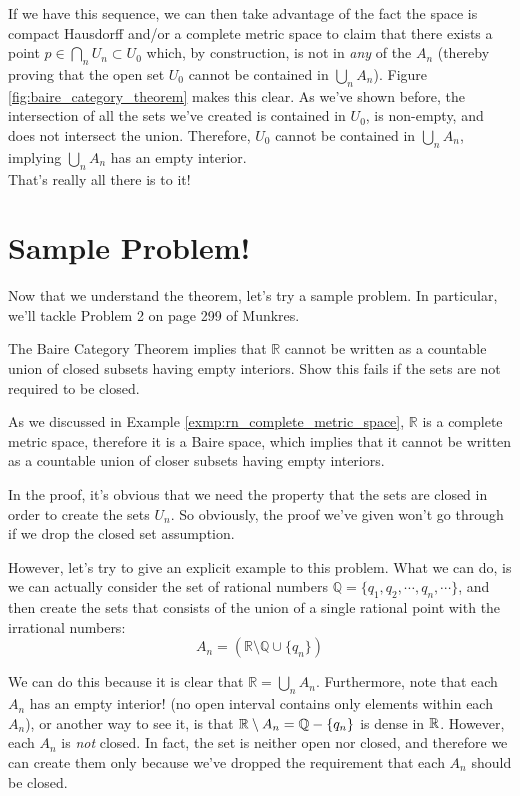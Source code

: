 \documentclass[english, 11pt]{article}
\begin{document}
  If we have this sequence, we can then take advantage of the fact the space is compact Hausdorff and/or a complete metric space to claim that there exists a point $p \in \bigcap_n U_n \subset U_0$ which, by construction, is not in \textit{any} of the $A_n$ (thereby proving that the open set $U_0$ cannot be contained in $\bigcup_n A_n$). Figure \ref{fig:baire_category_theorem} makes this clear. As we've shown before, the intersection of all the sets we've created is contained in $U_0$, is non-empty, and does not intersect the union. Therefore, $U_0$ cannot be contained in $\bigcup_n A_n$, implying $\bigcup_n A_n$ has an empty interior.\\

  That's really all there is to it!

  \section{Sample Problem!}
  Now that we understand the theorem, let's try a sample problem. In particular, we'll tackle Problem 2 on page 299 of Munkres.

  \begin{exmp}
  The Baire Category Theorem implies that $\mathbb{R}$ cannot be written as a countable union of closed subsets having empty interiors. Show this fails if the sets are not required to be closed.
  \end{exmp}
  As we discussed in Example \ref{exmp:rn_complete_metric_space}, $\mathbb{R}$ is a complete metric space, therefore it is a Baire space, which implies that it cannot be written as a countable union of closer subsets having empty interiors.

  In the proof, it's obvious that we need the property that the sets are closed in order to create the sets $U_n$. So obviously, the proof we've given won't go through if we drop the closed set assumption.

  However, let's try to give an explicit example to this problem. What we can do, is we can actually consider the set of rational numbers $\mathbb{Q} = \{q_1,q_2, \cdots, q_n, \cdots\}$, and then create the sets that consists of the union of a single rational point with the irrational numbers:
  $$
  A_n = (\mathbb{R} \setminus \mathbb{Q} \cup \{q_n\})
  $$

  We can do this because it is clear that $\mathbb{R} = \bigcup_n A_n$. Furthermore, note that each $A_n$ has an empty interior! (no open interval contains only elements within each $A_n$), or another way to see it, is that ${\mathbb{R}} \setminus A_n = {\mathbb{Q}} - \{q_n\}$ is dense in ${\mathbb{R}}$. However, each $A_n$ is \textit{not} closed. In fact, the set is neither open nor closed, and therefore we can create them only because we've dropped the requirement that each $A_n$ should be closed.\\
\end{document}
